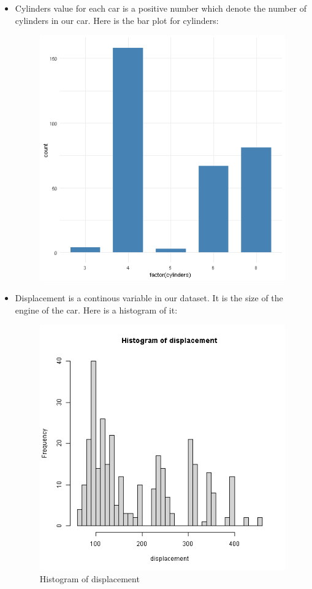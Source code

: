 \begin{itemize}
    \item Cylinders value for each car is a positive number which denote the number of cylinders in our car. Here is the bar plot for cylinders:

\begin{figure}[H]
\centering
\includegraphics[scale=0.55]{img/cylinderbarplot.png}
\label{fig:cylinder_bar_plot}
\end{figure}

    \item Displacement is a continous variable in our dataset. It is the size of the engine of the car. Here is a histogram of it:

\begin{figure}[H]
\centering
\includegraphics[scale=0.55]{img/disphist.png}
\caption{Histogram of displacement}
\label{fig:histogram_of_displacement}
\end{figure}


\end{itemize}
